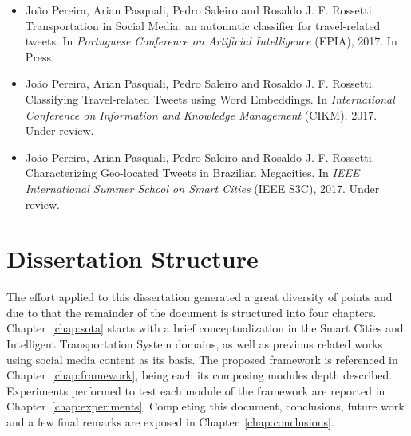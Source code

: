 \begin{itemize}
		\item
		João Pereira, Arian Pasquali, Pedro Saleiro and Rosaldo J. F. Rossetti. {\color{blue}Transportation in Social Media: an automatic classifier for travel-related tweets}. In \emph{Portuguese Conference on Artificial Intelligence} (EPIA), 2017. In Press.
		
		\item
		João Pereira, Arian Pasquali, Pedro Saleiro and Rosaldo J. F. Rossetti. {\color{blue}Classifying Travel-related Tweets using Word Embeddings}. In \emph{International Conference on Information and Knowledge Management} (CIKM), 2017. Under review.
		
		\item
		João Pereira, Arian Pasquali, Pedro Saleiro and Rosaldo J. F. Rossetti. {\color{blue}Characterizing Geo-located Tweets in Brazilian Megacities}. In \emph{IEEE International Summer School on Smart Cities} (IEEE S3C), 2017. Under review.
\end{itemize}

\section{Dissertation Structure}\label{sec:diss_structure}
The effort applied to this dissertation generated a great diversity of points and due to that the remainder of the document is structured into four chapters.
Chapter~\ref{chap:sota} starts with a brief conceptualization in the Smart Cities and Intelligent Transportation System domains, as well as previous related works using social media content as its basis.
The proposed framework is referenced in Chapter~\ref{chap:framework}, being each its composing modules depth described.
Experiments performed to test each module of the framework are reported in Chapter~\ref{chap:experiments}.
Completing this document, conclusions, future work and a few final remarks are exposed in Chapter~\ref{chap:conclusions}.